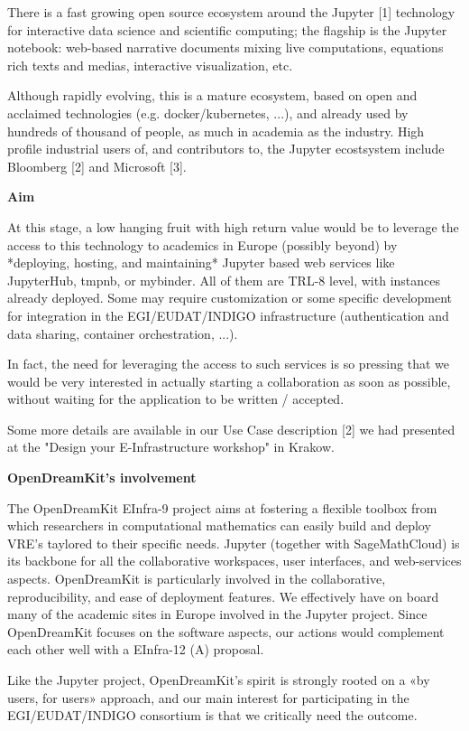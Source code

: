 There is a fast growing open source ecosystem around the Jupyter [1]
technology for interactive data science and scientific computing; the
flagship is the Jupyter notebook: web-based narrative documents mixing
live computations, equations rich texts and medias, interactive
visualization, etc.

Although rapidly evolving, this is a mature ecosystem, based on open
and acclaimed technologies (e.g. docker/kubernetes, ...), and already
used by hundreds of thousand of people, as much in academia as the
industry. High profile industrial users of, and contributors to, the
Jupyter ecostsystem include Bloomberg [2] and Microsoft [3].

\textbf{Aim}

At this stage, a low hanging fruit with high return value would be to
leverage the access to this technology to academics in Europe
(possibly beyond) by *deploying, hosting, and maintaining* Jupyter
based web services like JupyterHub, tmpnb, or mybinder. All of them
are TRL-8 level, with instances already deployed. Some may require
customization or some specific development for integration in the
EGI/EUDAT/INDIGO infrastructure (authentication and data sharing,
container orchestration, ...).

In fact, the need for leveraging the access to such services is so
pressing that we would be very interested in actually starting a
collaboration as soon as possible, without waiting for the application
to be written / accepted.

Some more details are available in our Use Case description [2] we had
presented at the "Design your E-Infrastructure workshop" in Krakow.

\textbf{OpenDreamKit's involvement}

The OpenDreamKit EInfra-9 project aims at fostering a flexible toolbox
from which researchers in computational mathematics can easily build
and deploy VRE's taylored to their specific needs. Jupyter (together
with SageMathCloud) is its backbone for all the collaborative
workspaces, user interfaces, and web-services aspects. OpenDreamKit is
particularly involved in the collaborative, reproducibility, and ease
of deployment features. We effectively have on board many of the
academic sites in Europe involved in the Jupyter project. Since
OpenDreamKit focuses on the software aspects, our actions would
complement each other well with a EInfra-12 (A) proposal.

Like the Jupyter project, OpenDreamKit's spirit is strongly rooted on
a «by users, for users» approach, and our main interest for
participating in the EGI/EUDAT/INDIGO consortium is that we critically
need the outcome.

